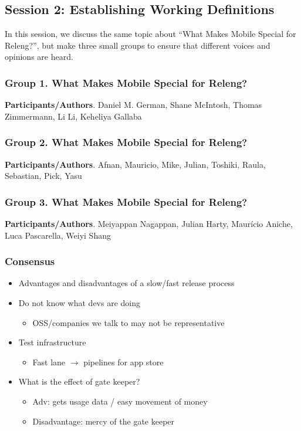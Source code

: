 \documentclass[a4paper]{article}
\newcommand{\smallsection}[1]{\noindent \textbf{#1}. }
\begin{document}
\subsection{Session 2: Establishing Working Definitions}
In this session, we discuss the same topic about ``What Makes Mobile Special for Releng?'', but make three small groups to ensure that different voices and opinions are heard. 

\subsubsection{Group 1. What Makes Mobile Special for Releng?}
\smallsection{Participants/Authors}
Daniel M. German, Shane McIntosh, Thomas Zimmermann, Li Li, Keheliya Gallaba

\subsubsection{Group 2. What Makes Mobile Special for Releng?}
\smallsection{Participants/Authors}
Afnan, Mauricio, Mike, Julian, Toshiki, Raula, Sebastian, Pick, Yasu

\subsubsection{Group 3. What Makes Mobile Special for Releng?}
\smallsection{Participants/Authors}
Meiyappan Nagappan, Julian Harty, Maur\'{i}cio Aniche, Luca Pascarella, Weiyi Shang

\subsubsection{Consensus}

\begin{itemize}
\tightlist
    \item Advantages and disadvantages of a slow/fast release process
    \item Do not know what devs are doing
    \begin{itemize}
    \tightlist
        \item OSS/companies we talk to may not be representative
    \end{itemize}
    \item Test infrastructure
    \begin{itemize}
    \tightlist
        \item Fast lane $\rightarrow$ pipelines for app store
    \end{itemize}
    \item What is the effect of gate keeper?
    \begin{itemize}
    \tightlist
        \item Adv: gets usage data / easy movement of money
        \item Disadvantage: mercy of the gate keeper
    \end{itemize}
\end{itemize}
\end{document}
